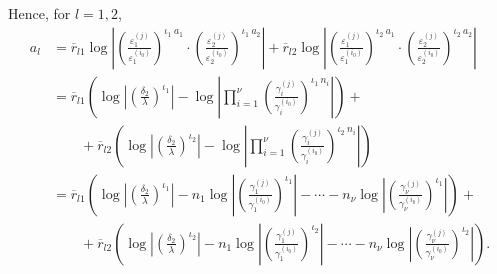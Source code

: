 Hence, for $l =1,2$,
\begin{align*}
a_l	& = \overline{r}_{l1}\log\left|\left(\frac{\varepsilon_1^{(j)}}{\varepsilon_1^{(i_0)}}\right)^{\iota_1 \ a_1} 		\cdot \left(\frac{\varepsilon_2^{(j)}}{\varepsilon_2^{(i_0)}}\right)^{\iota_1 \ a_2}\right| + 
	\overline{r}_{l2}\log\left|\left(\frac{\varepsilon_1^{(j)}}{\varepsilon_1^{(i_0)}}\right)^{\iota_2\ a_1}
	\cdot \left(\frac{\varepsilon_2^{(j)}}{\varepsilon_2^{(i_0)}}\right)^{\iota_2 \ a_2}\right|\\
	& = \overline{r}_{l1}\left( \log\left|\left(\frac{\delta_2}{\lambda}\right)^{\iota_1}\right| - \log\left| \prod_{i = 1}^{\nu} \left( \frac{\gamma_i^{(j)}}{\gamma_i^{(i_0)}}\right)^{\iota_1 \ n_i}\right|\right) + \\ 
	& \quad \quad + \overline{r}_{l2}\left( \log\left|\left(\frac{\delta_2}{\lambda}\right)^{\iota_2}\right| - \log\left| \prod_{i = 1}^{\nu} \left( \frac{\gamma_i^{(j)}}{\gamma_i^{(i_0)}}\right)^{\iota_2 \ n_i}\right|\right)\\
	& = \overline{r}_{l1}\left(\log\left|\left(\frac{\delta_2}{\lambda}\right)^{\iota_1}\right| - 
	n_1\log\left| \left( \frac{\gamma_1^{(j)}}{\gamma_1^{(i_0)}}\right)^{\iota_1}\right| - \cdots -n_{\nu}\log \left|\left( \frac{\gamma_{\nu}^{(j)}}{\gamma_{\nu}^{(i_0)}}\right)^{\iota_1}\right|\right) + \\
	& \quad \quad + \overline{r}_{l2}\left(\log\left|\left(\frac{\delta_2}{\lambda}\right)^{\iota_2}\right| - 
	n_1\log\left| \left( \frac{\gamma_1^{(j)}}{\gamma_1^{(i_0)}}\right)^{\iota_2}\right| - \cdots -n_{\nu}\log \left|\left( \frac{\gamma_{\nu}^{(j)}}{\gamma_{\nu}^{(i_0)}}\right)^{\iota_2}\right|\right).
\end{align*}

